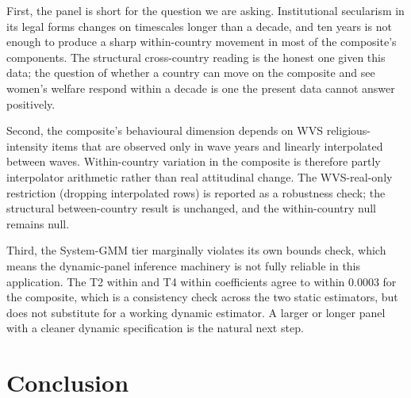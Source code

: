 \documentclass[12pt,a4paper]{article}
\begin{document}
First, the panel is short for the question we are asking. Institutional secularism in its legal forms changes on timescales longer than a decade, and ten years is not enough to produce a sharp within-country movement in most of the composite's components. The structural cross-country reading is the honest one given this data; the question of whether a country can move on the composite and see women's welfare respond within a decade is one the present data cannot answer positively.

Second, the composite's behavioural dimension depends on WVS religious-intensity items that are observed only in wave years and linearly interpolated between waves. Within-country variation in the composite is therefore partly interpolator arithmetic rather than real attitudinal change. The WVS-real-only restriction (dropping interpolated rows) is reported as a robustness check; the structural between-country result is unchanged, and the within-country null remains null.

Third, the System-GMM tier marginally violates its own bounds check, which means the dynamic-panel inference machinery is not fully reliable in this application. The T2 within and T4 within coefficients agree to within $0.0003$ for the composite, which is a consistency check across the two static estimators, but does not substitute for a working dynamic estimator. A larger or longer panel with a cleaner dynamic specification is the natural next step.

\section{Conclusion}
\end{document}
